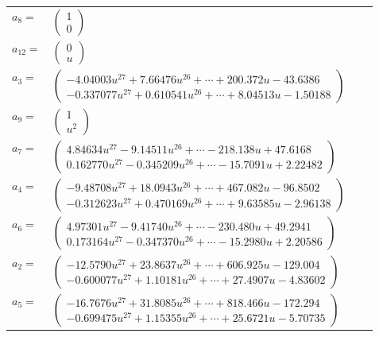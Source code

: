 \documentclass[1p]{elsarticle_modified}
\theoremstyle{definition}
\begin{document}
\begin{tabular}{m{7pt} m{180pt} m{7pt} m{180pt} }
\flushright $a_{8}=$&$\begin{pmatrix}1\\0\end{pmatrix}$ \\
\flushright $a_{12}=$&$\begin{pmatrix}0\\u\end{pmatrix}$ \\
\flushright $a_{3}=$&$\begin{pmatrix}-4.04003 u^{27}+7.66476 u^{26}+\cdots+200.372 u-43.6386\\-0.337077 u^{27}+0.610541 u^{26}+\cdots+8.04513 u-1.50188\end{pmatrix}$ \\
\flushright $a_{9}=$&$\begin{pmatrix}1\\u^2\end{pmatrix}$ \\
\flushright $a_{7}=$&$\begin{pmatrix}4.84634 u^{27}-9.14511 u^{26}+\cdots-218.138 u+47.6168\\0.162770 u^{27}-0.345209 u^{26}+\cdots-15.7091 u+2.22482\end{pmatrix}$ \\
\flushright $a_{4}=$&$\begin{pmatrix}-9.48708 u^{27}+18.0943 u^{26}+\cdots+467.082 u-96.8502\\-0.312623 u^{27}+0.470169 u^{26}+\cdots+9.63585 u-2.96138\end{pmatrix}$ \\
\flushright $a_{6}=$&$\begin{pmatrix}4.97301 u^{27}-9.41740 u^{26}+\cdots-230.480 u+49.2941\\0.173164 u^{27}-0.347370 u^{26}+\cdots-15.2980 u+2.20586\end{pmatrix}$ \\
\flushright $a_{2}=$&$\begin{pmatrix}-12.5790 u^{27}+23.8637 u^{26}+\cdots+606.925 u-129.004\\-0.600077 u^{27}+1.10181 u^{26}+\cdots+27.4907 u-4.83602\end{pmatrix}$ \\
\flushright $a_{5}=$&$\begin{pmatrix}-16.7676 u^{27}+31.8085 u^{26}+\cdots+818.466 u-172.294\\-0.699475 u^{27}+1.15355 u^{26}+\cdots+25.6721 u-5.70735\end{pmatrix}$ \\

\end{tabular}
\end{document}
